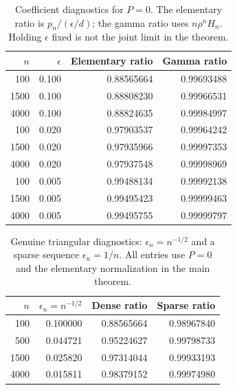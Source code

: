 \documentclass[11pt,a4paper]{article}
\numberwithin{equation}{section}
\theoremstyle{definition}
\theoremstyle{remark}
\begin{document}
\begin{table}[htbp]
\centering
\caption{Coefficient diagnostics for $P=0$. The elementary ratio is $p_n/(\epsilon/d)$; the gamma ratio uses $n\rho^nH_n$. Holding $\epsilon$ fixed is not the joint limit in the theorem.}
\label{tab:coefficients}
\begin{tabular}{rrrr}
\toprule $n$ & $\epsilon$ & Elementary ratio & Gamma ratio \\
\midrule
100 & 0.100 & 0.88565664 & 0.99693488 \\
1500 & 0.100 & 0.88808230 & 0.99966531 \\
4000 & 0.100 & 0.88824635 & 0.99984997 \\
100 & 0.020 & 0.97903537 & 0.99964242 \\
1500 & 0.020 & 0.97935966 & 0.99997353 \\
4000 & 0.020 & 0.97937548 & 0.99998969 \\
100 & 0.005 & 0.99488134 & 0.99992138 \\
1500 & 0.005 & 0.99495423 & 0.99999463 \\
4000 & 0.005 & 0.99495755 & 0.99999797 \\
\bottomrule
\end{tabular}
\end{table}

\begin{table}[htbp]
\centering
\caption{Genuine triangular diagnostics: $\epsilon_n=n^{-1/2}$ and a sparse sequence $\epsilon_n=1/n$. All entries use $P=0$ and the elementary normalization in the main theorem.}
\label{tab:triangular}
\begin{tabular}{rrrr}
\toprule $n$ & $\epsilon_n=n^{-1/2}$ & Dense ratio & Sparse ratio \\
\midrule
100 & 0.100000 & 0.88565664 & 0.98967840 \\
500 & 0.044721 & 0.95224627 & 0.99798733 \\
1500 & 0.025820 & 0.97314044 & 0.99933193 \\
4000 & 0.015811 & 0.98379152 & 0.99974980 \\
\bottomrule
\end{tabular}
\end{table}
\end{document}
